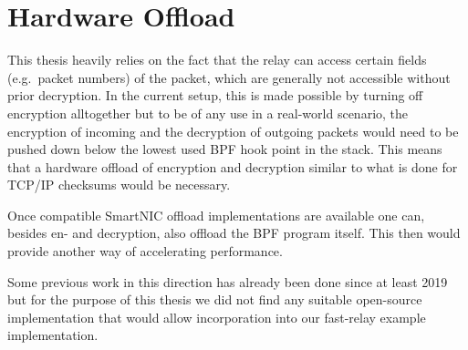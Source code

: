 \section{Hardware Offload}\label{sec:hardware_offload}
This thesis heavily relies on the fact that the relay can
access certain fields (e.g.~packet numbers) of the packet, 
which are generally not accessible without prior decryption.
In the current setup, this is made possible by turning off 
encryption alltogether but to be of any use in a real-world
scenario, the encryption of incoming and the decryption of
outgoing packets would need to be pushed down below the lowest 
used BPF hook point in the stack.
This means that a hardware offload of encryption and decryption
similar to what is done for TCP/IP checksums would be necessary.

Once compatible SmartNIC offload implementations are available one can, 
besides en- and decryption, also offload the BPF program itself.
This then would provide another way of accelerating performance.

Some previous work in this direction has already been done since 
at least 2019~\parencite{quic-nic-offload} but for the purpose of 
this thesis we did not find any suitable open-source implementation 
that would allow incorporation into our fast-relay example 
implementation.